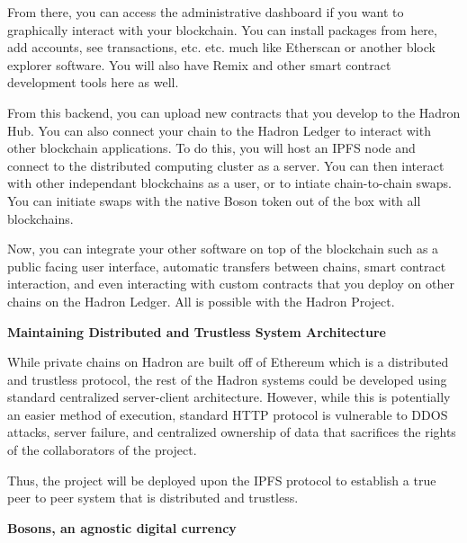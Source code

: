 \documentclass{%
	article}
\begin{document}
From there, you can access the administrative dashboard if you want to graphically interact with your blockchain. You can install packages from here, add accounts, see transactions, etc. etc. much like Etherscan or another block explorer software. You will also have Remix and other smart contract development tools here as well.

From this backend, you can upload new contracts that you develop to the Hadron Hub. You can also connect your chain to the Hadron Ledger to interact with other blockchain applications. To do this, you will host an IPFS node and connect to the distributed computing cluster as a server. You can then interact with other independant blockchains as a user, or to intiate chain-to-chain swaps. You can initiate swaps with the native Boson token out of the box with all blockchains.

Now, you can integrate your other software on top of the blockchain such as a public facing user interface, automatic transfers between chains, smart contract interaction, and even interacting with custom contracts that you deploy on other chains on the Hadron Ledger. All is possible with the Hadron Project.

\begin{center}
\textbf{Maintaining Distributed and Trustless System Architecture}
\end{center}

While private chains on Hadron are built off of Ethereum which is a distributed and trustless protocol, the rest of the Hadron systems could be developed using standard centralized server-client architecture. However, while this is potentially an easier method of execution, standard HTTP protocol is vulnerable to DDOS attacks, server failure, and centralized ownership of data that sacrifices the rights of the collaborators of the project.

Thus, the project will be deployed upon the IPFS protocol to establish a true peer to peer system that is distributed and trustless.

\begin{center}
\textbf{Bosons, an agnostic digital currency}
\end{center}
\end{document}
